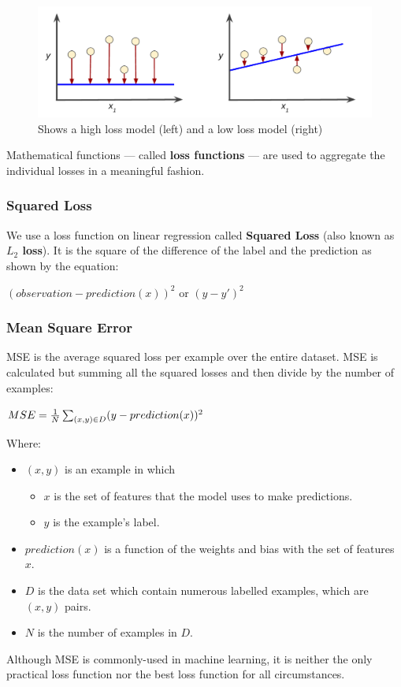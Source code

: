 \documentclass[12pt]{article}
\begin{document}
\begin{figure}[h]
\includegraphics[scale = 0.3]{imgs/LossSideBySide}
\centering
\caption{Shows a high loss model (left) and a low loss model (right)}
\end{figure}
Mathematical functions — called \textbf{loss functions} — are used to aggregate the individual losses in a meaningful fashion.
\subsubsection{Squared Loss}
We use a loss function on linear regression called \textbf{Squared Loss}  (also known as \textbf{$L_2$ loss}). It is the square of the difference of the label and the prediction as shown by the equation:
\begin{center}
$(observation - prediction(x))^2$ or $(y - y')^2$
\end{center}

\subsubsection{Mean Square Error}
MSE is the average squared loss per example over the entire dataset. MSE is calculated but summing all the squared losses and then divide by the number of examples:

\begin{center}
\large $MSE = {{1}\over {N}} \sum_{(x,y)\in D} (y - prediction(x))^2$
\end{center}
Where:
\begin{itemize}
	\item $(x,y)$ is an example in which
	\begin{itemize}
	\item $x$ is the set of features that the model uses to make predictions.
	\item $y$ is the example's label.
	\end{itemize}
	\item $prediction(x)$ is a function of the weights and bias with the set of features $x$.
	\item $D$ is the data set which contain numerous labelled examples, which are $(x,y)$ pairs.
	\item $N$ is the number of examples in $D$.
\end{itemize}
Although MSE is commonly-used in machine learning, it is neither the only practical loss function nor the best loss function for all circumstances.
\end{document}
